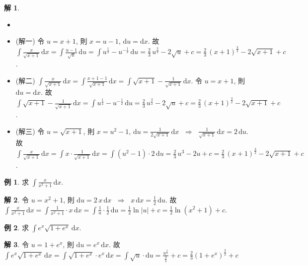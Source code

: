 \documentclass[12pt,a4paper]{extarticle}
\newcommand{\ds}{\displaystyle}
\newcommand{\ie}{\;\Longrightarrow\;}
\theoremstyle{definition}
\newtheorem*{ex}{例}
\newtheorem*{sol}{解}
\begin{document}
\begin{sol}
  \begin{itemize}
    \item[]
    \item (解一) 令 $\ds u = x + 1$, 則 $\ds x = u - 1$, $\ds\mathrm{d}u = \mathrm{d}x$. 故 $\ds\int\!\frac{x}{\sqrt{x + 1}}\,\mathrm{d}x = \int\!\frac{u - 1}{\sqrt{u}}\,\mathrm{d}u = \int\!u^{\frac{1}{2}} - u^{-\frac{1}{2}}\,\mathrm{d}u = \frac{2}{3}\,u^{\frac{3}{2}} - 2\sqrt{u} + c = \frac{2}{3}\,(x + 1)^{\frac{3}{2}} - 2\sqrt{x + 1} + c$. 
    \item (解二) $\ds\int\!\frac{x}{\sqrt{x + 1}}\,\mathrm{d}x = \int\!\frac{x + 1 - 1}{\sqrt{x + 1}}\,\mathrm{d}x = \int\!\sqrt{x + 1} - \frac{1}{\sqrt{x + 1}}\,\mathrm{d}x$. 令 $\ds u = x + 1$, 則 $\ds\mathrm{d}u = \mathrm{d}x$. 故 $\ds\int\!\sqrt{x + 1} - \frac{1}{\sqrt{x + 1}}\,\mathrm{d}x = \int\!u^{\frac{1}{2}} - u^{-\frac{1}{2}}\,\mathrm{d}u = \frac{2}{3}\,u^{\frac{3}{2}} - 2\sqrt{u} + c = \frac{2}{3}\,(x + 1)^{\frac{3}{2}} - 2\sqrt{x + 1} + c$. 
    \item (解三) 令 $\ds u = \sqrt{x + 1}$, 則 $\ds x = u^2 - 1$, $\ds\mathrm{d}u = \frac{1}{2\sqrt{x + 1}}\,\mathrm{d}x$ $\ie$ $\ds\frac{1}{\sqrt{x + 1}}\,\mathrm{d}x = 2\,\mathrm{d}u$. 故 $\ds\int\!\frac{x}{\sqrt{x + 1}}\,\mathrm{d}x = \int\!x\cdot\frac{1}{\sqrt{x + 1}}\,\mathrm{d}x = \int\!(u^2 - 1)\cdot2\,\mathrm{d}u = \frac{2}{3}\,u^3 - 2u + c = \frac{2}{3}\,(x + 1)^{\frac{3}{2}} - 2\sqrt{x + 1} + c$. 
  \end{itemize}
\end{sol}

\begin{ex}
  求 $\ds\int\!\frac{x}{x^2+1}\,\mathrm{d}x$. 
\end{ex}

\begin{sol}
  令 $\ds u = x^2 + 1$, 則 $\ds\mathrm{d}u = 2\,x\,\mathrm{d}x$ $\ie$ $\ds x\,\mathrm{d}x=\frac{1}{2}\,\mathrm{d}u$. 故 $\ds\int\!\frac{x}{x^2+1}\,\mathrm{d}x = \int\!\frac{1}{x^2+1}\cdot x\,\mathrm{d}x = \int\!\frac{1}{u}\cdot\frac{1}{2}\,\mathrm{d}u = \frac{1}{2}\ln|u| + c = \frac{1}{2}\ln(x^2 + 1) + c$. 
\end{sol}
    
\begin{ex}
  求 $\ds\int e^x\sqrt{1 + e^x}\,\mathrm{d}x$. 
\end{ex}

\begin{sol}
  令 $u = 1 + e^x$, 則 $\ds\mathrm{d}u = e^x\,\mathrm{d}x$. 故 $\ds\int e^x\sqrt{1 + e^x}\,\mathrm{d}x = \int \sqrt{1 + e^x}\cdot e^x\,\mathrm{d}x = \int\!\sqrt{u}\cdot\mathrm{d}u = \frac{u^{\frac{3}{2}}}{\frac{3}{2}} + c = \frac{2}{3}(1 + e^x)^{\frac{3}{2}} + c$
\end{sol}
\end{document}
